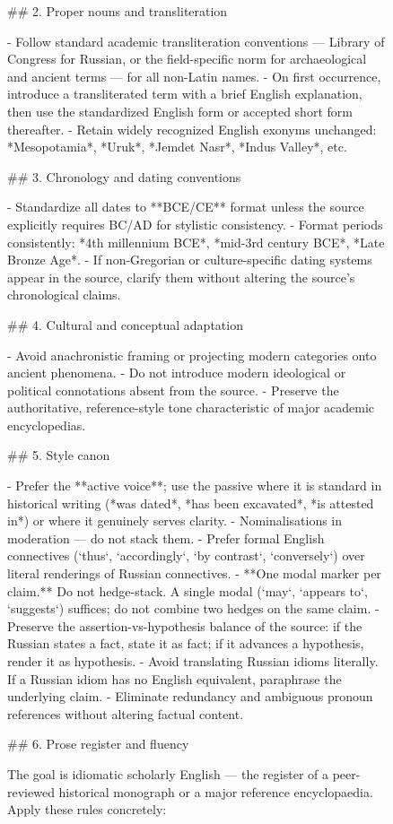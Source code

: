 \documentclass[11pt]{article}
\begin{document}
\begin{figure}[ht!]
\begin{prompt}
## 2. Proper nouns and transliteration

- Follow standard academic transliteration conventions — Library of Congress for Russian, or the field-specific norm for archaeological and ancient terms — for all non-Latin names.
- On first occurrence, introduce a transliterated term with a brief English explanation, then use the standardized English form or accepted short form thereafter.
- Retain widely recognized English exonyms unchanged: *Mesopotamia*, *Uruk*, *Jemdet Nasr*, *Indus Valley*, etc.

## 3. Chronology and dating conventions

- Standardize all dates to **BCE/CE** format unless the source explicitly requires BC/AD for stylistic consistency.
- Format periods consistently: *4th millennium BCE*, *mid-3rd century BCE*, *Late Bronze Age*.
- If non-Gregorian or culture-specific dating systems appear in the source, clarify them without altering the source's chronological claims.

## 4. Cultural and conceptual adaptation

- Avoid anachronistic framing or projecting modern categories onto ancient phenomena.
- Do not introduce modern ideological or political connotations absent from the source.
- Preserve the authoritative, reference-style tone characteristic of major academic encyclopedias.

## 5. Style canon

- Prefer the **active voice**; use the passive where it is standard in historical writing (*was dated*, *has been excavated*, *is attested in*) or where it genuinely serves clarity.
- Nominalisations in moderation — do not stack them.
- Prefer formal English connectives (`thus`, `accordingly`, `by contrast`, `conversely`) over literal renderings of Russian connectives.
- **One modal marker per claim.** Do not hedge-stack. A single modal (`may`, `appears to`, `suggests`) suffices; do not combine two hedges on the same claim.
- Preserve the assertion-vs-hypothesis balance of the source: if the Russian states a fact, state it as fact; if it advances a hypothesis, render it as hypothesis.
- Avoid translating Russian idioms literally. If a Russian idiom has no English equivalent, paraphrase the underlying claim.
- Eliminate redundancy and ambiguous pronoun references without altering factual content.

## 6. Prose register and fluency

The goal is idiomatic scholarly English — the register of a peer-reviewed historical monograph or a major reference encyclopaedia. Apply these rules concretely:


\end{prompt}
\end{figure}
\end{document}
